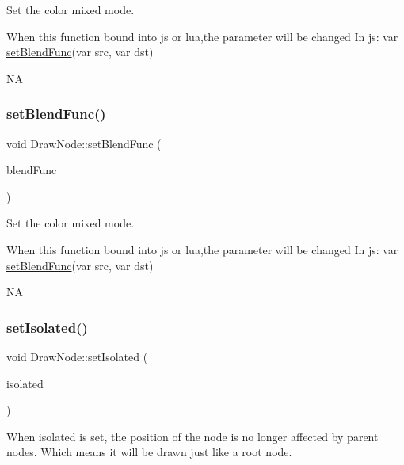 Set the color mixed mode. 
\begin{DoxyCode}
When \textcolor{keyword}{this} \textcolor{keyword}{function} bound into js or lua,the parameter will be changed
In js: var \hyperlink{classDrawNode_aa2fec0829a3f19c5996946fc25eccd66}{setBlendFunc}(var src, var dst)
\end{DoxyCode}
  NA \mbox{\label{classDrawNode_aa2fec0829a3f19c5996946fc25eccd66}} 
\subsubsection{\texorpdfstring{set\+Blend\+Func()}{setBlendFunc()}\hspace{0.1cm}{\footnotesize\ttfamily [2/2]}}
{\footnotesize\ttfamily void Draw\+Node\+::set\+Blend\+Func (\begin{DoxyParamCaption}\item[{const \hyperlink{structBlendFunc}{Blend\+Func} \&}]{blend\+Func }\end{DoxyParamCaption})}

Set the color mixed mode. 
\begin{DoxyCode}
When \textcolor{keyword}{this} \textcolor{keyword}{function} bound into js or lua,the parameter will be changed
In js: var \hyperlink{classDrawNode_aa2fec0829a3f19c5996946fc25eccd66}{setBlendFunc}(var src, var dst)
\end{DoxyCode}
  NA \mbox{\label{classDrawNode_aea4968d4500887d631d759fccc8cf4df}} 
\subsubsection{\texorpdfstring{set\+Isolated()}{setIsolated()}}
{\footnotesize\ttfamily void Draw\+Node\+::set\+Isolated (\begin{DoxyParamCaption}\item[{bool}]{isolated }\end{DoxyParamCaption})\hspace{0.3cm}{\ttfamily [inline]}}

When isolated is set, the position of the node is no longer affected by parent nodes. Which means it will be drawn just like a root node. \mbox{\label{classDrawNode_adffd70536383fa1dd73ab4a6e785808a}} 
